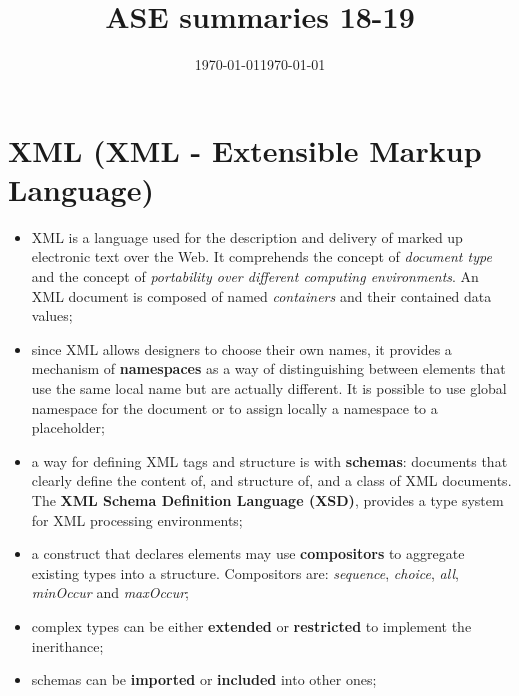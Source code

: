 \documentclass[oneside]{article}
\title{ASE summaries 18-19}
\date{\today}
\date{\today}
\begin{document}
\maketitle

\section{XML (XML - Extensible Markup Language)}
\begin{itemize}
    \item XML is a language used for the description and delivery of marked up electronic text over the Web. It comprehends the concept of \textit{document type} and the concept of \textit{portability over different computing environments}. An XML document is composed of named \textit{containers} and their contained data values;
    
    \item since XML allows designers to choose their own names, it provides a mechanism of \textbf{namespaces} as a way of distinguishing between elements that use the same local name but are actually different. It is possible to use global namespace for the document or to assign locally a namespace to a placeholder;
    
    \item a way for defining XML tags and structure is with \textbf{schemas}: documents that clearly define the content of, and structure of, and a class of XML documents. The \textbf{XML Schema Definition Language (XSD)}, provides a type system for XML processing environments;
    
    \item a construct that declares elements may use \textbf{compositors} to aggregate existing types into a structure. Compositors are: \textit{sequence}, \textit{choice}, \textit{all}, \textit{minOccur} and \textit{maxOccur};
    
    \item complex types can be either \textbf{extended} or \textbf{restricted} to implement the inerithance;
    
    \item schemas can be \textbf{imported} or \textbf{included} into other ones;
\end{itemize}




\end{document}

